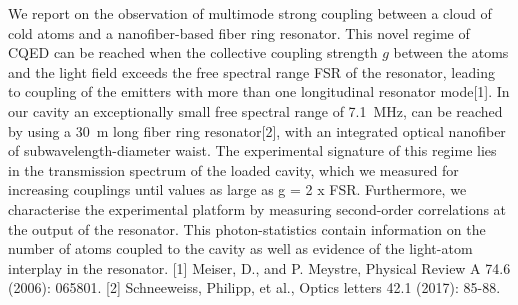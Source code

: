 \documentclass{scdpg}
\begin{document}
\begin{scAbstract}
\scNoUseTeX
{}
\scBeginText
We report on the observation of multimode strong coupling between a cloud of cold atoms and a nanofiber-based fiber ring resonator. This novel regime of CQED can be reached when the collective coupling strength $g$ between the atoms and the light field exceeds the free spectral range FSR of the resonator, leading to coupling of the emitters with more than one longitudinal resonator mode[1].
In our cavity an exceptionally small free spectral range of 7.1~MHz, can be reached by using a 30~m long fiber ring resonator[2], with an integrated optical nanofiber of subwavelength-diameter waist.
The experimental signature of this regime lies in the transmission spectrum of the loaded cavity, which we measured for increasing couplings until values as large as g = 2 x FSR.
Furthermore, we characterise the experimental platform by measuring second-order correlations at the output of the resonator.
This photon-statistics contain information on the number of atoms coupled to the cavity as well as evidence of the light-atom interplay in the resonator.
[1] Meiser, D., and P. Meystre, Physical Review A 74.6 (2006): 065801.
[2] Schneeweiss, Philipp, et al., Optics letters 42.1 (2017): 85-88.


\scEndText
{}
\end{scAbstract}
\end{document}
